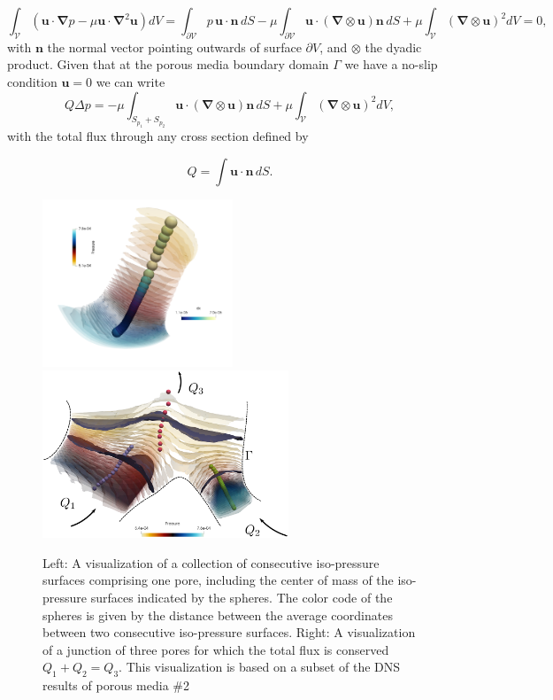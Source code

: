 \documentclass[draft]{agujournal2019}
\begin{document}
\begin{equation}
\int_{\mathcal{V}} \left(\mathbf{u}\cdot\mathbf{\nabla} p-\mu \mathbf{u}\cdot\mathbf{\nabla}^2 \mathbf{u}\right) dV 
= \int_{\partial \mathcal{V}}  p\,\mathbf{u}\cdot\mathbf{n}\,dS-\mu \int_{\partial \mathcal{V}} \mathbf{u}\cdot (\mathbf{\nabla}\otimes \mathbf{u})\mathbf{n}\,dS+\mu \int_{\mathcal{V}} (\mathbf{\nabla}\otimes\mathbf{u})^2 dV=0, \label{eq:stokes_dissipation}
\end{equation}
with $\mathbf{n}$ the normal vector pointing outwards of surface $\partial V$, and $\otimes$ the dyadic product. Given that at the porous media boundary domain $\Gamma$ we have a no-slip condition $\mathbf{u}=0$ we can write 
\begin{equation}
	Q \Delta p = -\mu\int_{S_{p_1}+S_{p_2}} \mathbf{u}\cdot (\mathbf{\nabla}\otimes \mathbf{u})\mathbf{n}\,dS +\mu \int_{\mathcal{V}} (\mathbf{\nabla}\otimes \mathbf{u})^2 dV, \label{eq:pressuredrop}
\end{equation}
with the total flux through any cross section defined by 

\begin{equation}
	Q=\int \mathbf{u}\cdot\mathbf{n}\, dS.
\end{equation}


\begin{figure}[t!]
\includegraphics[height=5cm]{figures/example_pore.png}~~~~
\includegraphics[height=5cm]{figures/merging_pores.eps}
\caption{Left: A visualization of a collection of consecutive iso-pressure surfaces comprising one pore, including the center of mass of the iso-pressure surfaces indicated by the spheres. The color code of the spheres is given by the distance between the average coordinates between two consecutive iso-pressure surfaces. Right: A visualization of a junction of three pores for which the total flux is conserved $Q_1+Q_2 = Q_3$. This visualization is based on a subset of the DNS results of porous media \#2}
\label{fig:isop_surfaces}
\end{figure}
\end{document}
